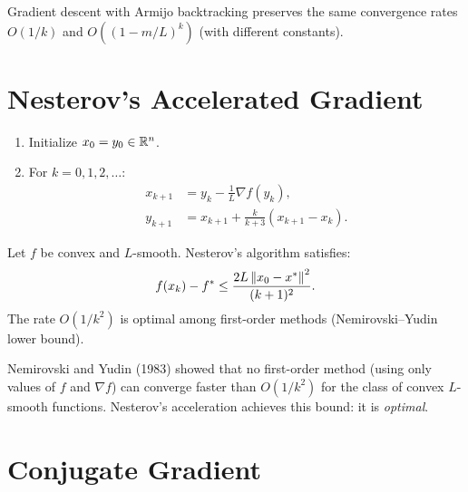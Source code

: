 \begin{proposition}
Gradient descent with Armijo backtracking preserves the same convergence rates
$O(1/k)$ and $O((1-m/L)^k)$ (with different constants).
\end{proposition}

\section{Nesterov's Accelerated Gradient}

\begin{algorithme}[title=\textbf{Nesterov's Accelerated Gradient (NAG)}]
\begin{enumerate}
    \item Initialize $x_0 = y_0 \in \mathbb{R}^n$.
    \item For $k = 0, 1, 2, \ldots$:
    \begin{align*}
        x_{k+1} &= y_k - \frac{1}{L}\nabla f(y_k), \\
        y_{k+1} &= x_{k+1} + \frac{k}{k+3}(x_{k+1} - x_k).
    \end{align*}
\end{enumerate}
\end{algorithme}

\begin{theorem}
\label{thm:nesterov}
Let $f$ be convex and $L$-smooth. Nesterov's algorithm satisfies:
\[
    f(x_k) - f^* \leq \frac{2L\left\| x_0 - x^* \right\|^2}{(k+1)^2}.
\]
The rate $O(1/k^2)$ is optimal among first-order methods
(Nemirovski--Yudin lower bound).
\end{theorem}

\begin{warning}[title=\textbf{Optimality of the $O(1/k^2)$ Rate}]
Nemirovski and Yudin (1983) showed that no first-order method (using only values of
$f$ and $\nabla f$) can converge faster than $O(1/k^2)$ for the class of convex
$L$-smooth functions. Nesterov's acceleration achieves this bound: it is \emph{optimal}.
\end{warning}

\section{Conjugate Gradient}

